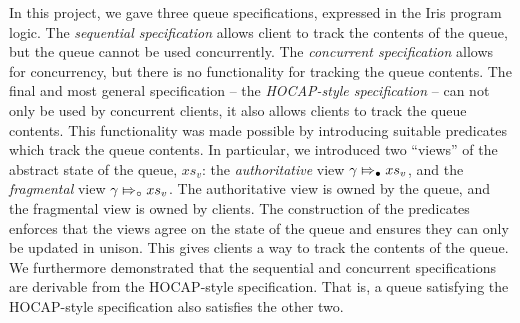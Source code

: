 \documentclass[a4paper, 10pt]{report}
\theoremstyle{definition}
\newcommand{\absvalueList}{xs_v}
\newcommand{\abstractstatefullfrag}[2]{#1 \Mapsto_{\circ} #2}
\newcommand{\abstractstateauth}[2]{#1 \Mapsto_{\bullet} #2}
\begin{document}
In this project, we gave three queue specifications, expressed in the Iris program logic. The \textit{sequential specification} allows client to track the contents of the queue, but the queue cannot be used concurrently. The \textit{concurrent specification} allows for concurrency, but there is no functionality for tracking the queue contents. The final and most general specification -- the \textit{HOCAP-style specification} -- can not only be used by concurrent clients, it also allows clients to track the queue contents. This functionality was made possible by introducing suitable predicates which track the queue contents. In particular, we introduced two ``views'' of the abstract state of the queue, $\absvalueList$: the \textit{authoritative} view $\abstractstateauth{\gname}{\absvalueList}$, and the \textit{fragmental} view $\abstractstatefullfrag{\gname}{\absvalueList}$. The authoritative view is owned by the queue, and the fragmental view is owned by clients. The construction of the predicates enforces that the views agree on the state of the queue and ensures they can only be updated in unison. This gives clients a way to track the contents of the queue.\\
We furthermore demonstrated that the sequential and concurrent specifications are derivable from the HOCAP-style specification. That is, a queue satisfying the HOCAP-style specification also satisfies the other two.
\end{document}
